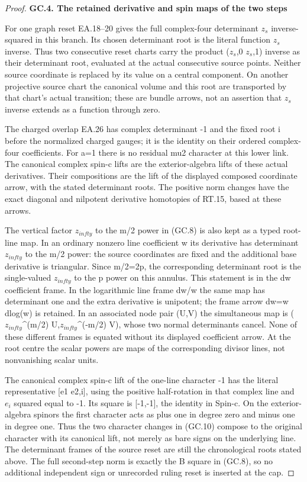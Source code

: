 \begin{proof}
\par

\medskip\noindent\textbf{GC.4. The retained derivative and spin maps of the two steps}

\par\nobreak

For one graph reset EA.18--20 gives the full complex-four
determinant \(z_{s}\) inverse-squared in this branch. Its chosen
determinant root is the literal function \(z_{s}\) inverse. Thus two
consecutive reset charts carry the product
(\(z_{s}\),0 \(z_{s}\),1) inverse as their determinant root, evaluated at
the actual consecutive source points. Neither source coordinate
is replaced by its value on a central component. On another
projective source chart the canonical volume and this root are
transported by that chart's actual transition; these are bundle
arrows, not an assertion that \(z_{s}\) inverse extends as a function
through zero.

The charged overlap EA.26 has complex determinant -1 and the
fixed root i before the normalized charged gauges; it is the
identity on their ordered complex-four coefficients. For a=1
there is no residual mu2 character at this lower link. The
canonical complex spin-c lifts are the exterior-algebra lifts
of these actual derivatives. Their compositions are the lift
of the displayed composed coordinate arrow, with the stated
determinant roots. The positive norm changes have the exact
diagonal and nilpotent derivative homotopies of RT.15, based
at these arrows.

The vertical factor \(z_{infty}\) to the m/2 power in (GC.8) is also
kept as a typed root-line map. In an ordinary nonzero line
coefficient w its derivative has determinant \(z_{infty}\) to the
m/2 power: the source coordinates are fixed and the additional
base derivative is triangular. Since m/2=2p, the corresponding
determinant root is the single-valued \(z_{infty}\) to the p power
on this annulus. This statement is in the dw coefficient frame.
In the logarithmic line frame dw/w the same map has determinant
one and the extra derivative is unipotent; the frame arrow
dw=w dlog(w) is retained. In an associated node pair (U,V)
the simultaneous map is (\(z_{infty}\)\^{}(m/2) U,\(z_{infty}\)\^{}(-m/2) V),
whose two normal determinants cancel. None of these different
frames is equated without its displayed coefficient arrow.
At the root centre the scalar powers are maps of the
corresponding divisor lines, not nonvanishing scalar units.

The canonical complex spin-c lift of the one-line character
-1 has the literal representative {[}e1 e2,i{]}, using the
positive half-rotation in that complex line and \(e_{i}\) squared
equal to -1. Its square is {[}-1,-1{]}, the identity in Spin-c.
On the exterior-algebra spinors the first character acts as
plus one in degree zero and minus one in degree one. Thus the
two character changes in (GC.10) compose to the original
character with its canonical lift, not merely as bare signs
on the underlying line. The determinant frames of the source
reset are still the chronological roots stated above. The full
second-step norm is exactly the B square in (GC.8), so no
additional independent sign or unrecorded ruling reset is
inserted at the cap.


\end{proof}
